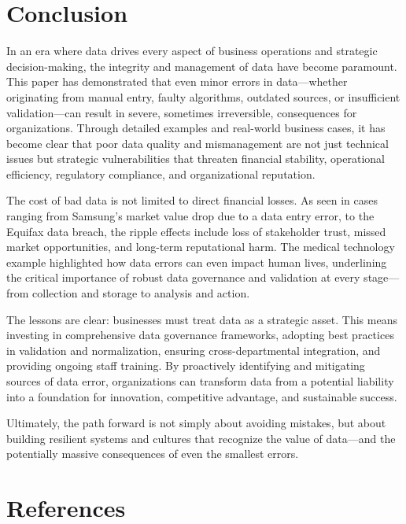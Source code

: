 \documentclass[
  man,
  floatsintext,
  longtable,
  nolmodern,
  notxfonts,
  notimes,
  colorlinks=true,linkcolor=blue,citecolor=blue,urlcolor=blue]{apa7}
\begin{document}
\section{Conclusion}\label{conclusion}

In an era where data drives every aspect of business operations and
strategic decision-making, the integrity and management of data have
become paramount. This paper has demonstrated that even minor errors in
data---whether originating from manual entry, faulty algorithms,
outdated sources, or insufficient validation---can result in severe,
sometimes irreversible, consequences for organizations. Through detailed
examples and real-world business cases, it has become clear that poor
data quality and mismanagement are not just technical issues but
strategic vulnerabilities that threaten financial stability, operational
efficiency, regulatory compliance, and organizational reputation.

The cost of bad data is not limited to direct financial losses. As seen
in cases ranging from Samsung's market value drop due to a data entry
error, to the Equifax data breach, the ripple effects include loss of
stakeholder trust, missed market opportunities, and long-term
reputational harm. The medical technology example highlighted how data
errors can even impact human lives, underlining the critical importance
of robust data governance and validation at every stage---from
collection and storage to analysis and action.

The lessons are clear: businesses must treat data as a strategic asset.
This means investing in comprehensive data governance frameworks,
adopting best practices in validation and normalization, ensuring
cross-departmental integration, and providing ongoing staff training. By
proactively identifying and mitigating sources of data error,
organizations can transform data from a potential liability into a
foundation for innovation, competitive advantage, and sustainable
success.

Ultimately, the path forward is not simply about avoiding mistakes, but
about building resilient systems and cultures that recognize the value
of data---and the potentially massive consequences of even the smallest
errors.

\section{References}\label{references}
\end{document}
